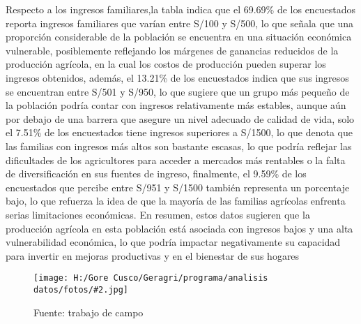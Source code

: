 \documentclass{article}\usepackage[]{graphicx}\usepackage[table]{xcolor}
\makeatletter
\newenvironment{kframe}{%
 \def\at@end@of@kframe{}%
 \ifinner\ifhmode%
  \def\at@end@of@kframe{\end{minipage}}%
  \begin{minipage}{\columnwidth}%
 \fi\fi%
 \def\FrameCommand##1{\hskip\@totalleftmargin \hskip-\fboxsep
 \colorbox{shadecolor}{##1}\hskip-\fboxsep
     \hskip-\linewidth \hskip-\@totalleftmargin \hskip\columnwidth}%
 \MakeFramed {\advance\hsize-\width
   \@totalleftmargin\z@ \linewidth\hsize
   \@setminipage}}%
 {\par\unskip\endMakeFramed%
 \at@end@of@kframe}
\newenvironment{fotos}[2]
{\begin{figure}[H]
	\centering
	\caption{#1}
	\texttt{[image: H:/Gore Cusco/Geragri/programa/analisis datos/fotos/\#2.jpg]}
	\caption*{Fuente: trabajo de campo}}
{\end{figure}}
\makeatother
\begin{document}
Respecto a los ingresos familiares,la tabla indica que el 69.69\% de los encuestados reporta ingresos familiares que varían entre S/100 y S/500, lo que señala que una proporción considerable de la población se encuentra en una situación económica vulnerable, posiblemente reflejando los márgenes de ganancias reducidos de la producción agrícola, en la cual los costos de producción pueden superar los ingresos obtenidos, además, el 13.21\% de los encuestados indica que sus ingresos se encuentran entre S/501 y S/950, lo que sugiere que un grupo más pequeño de la población podría contar con ingresos relativamente más estables, aunque aún por debajo de una barrera que asegure un nivel adecuado de calidad de vida, solo el 7.51\% de los encuestados tiene ingresos superiores a S/1500, lo que denota que las familias con ingresos más altos son bastante escasas, lo que podría reflejar las dificultades de los agricultores para acceder a mercados más rentables o la falta de diversificación en sus fuentes de ingreso, finalmente, el 9.59\% de los encuestados que percibe entre S/951 y S/1500 también representa un porcentaje bajo, lo que refuerza la idea de que la mayoría de las familias agrícolas enfrenta serias limitaciones económicas. En resumen, estos datos sugieren que la producción agrícola en esta población está asociada con ingresos bajos y una alta vulnerabilidad económica, lo que podría impactar negativamente su capacidad para invertir en mejoras productivas y en el bienestar de sus hogares
\begin{fotos}
{Sensibililzacion a los beneficiarios}{4}
\end{fotos}


\begin{table}[H]
  \centering
  \caption{Numero de integrantes que conforman su familia}
\begin{kframe}


{\ttfamily\noindent\bfseries{}}

{\ttfamily\noindent\bfseries{}}

{\ttfamily\noindent\bfseries\color{errorcolor}{\#\# Error: objeto 'datos' no encontrado}}

{\ttfamily\noindent\bfseries\color{errorcolor}{\#\# Error: objeto 'datos' no encontrado}}

{\ttfamily\noindent\bfseries\color{errorcolor}{\#\# Error: objeto 'datos' no encontrado}}\end{kframe}
  \caption*{Fuente: Trabajo de campo}
\end{table}
\end{document}

